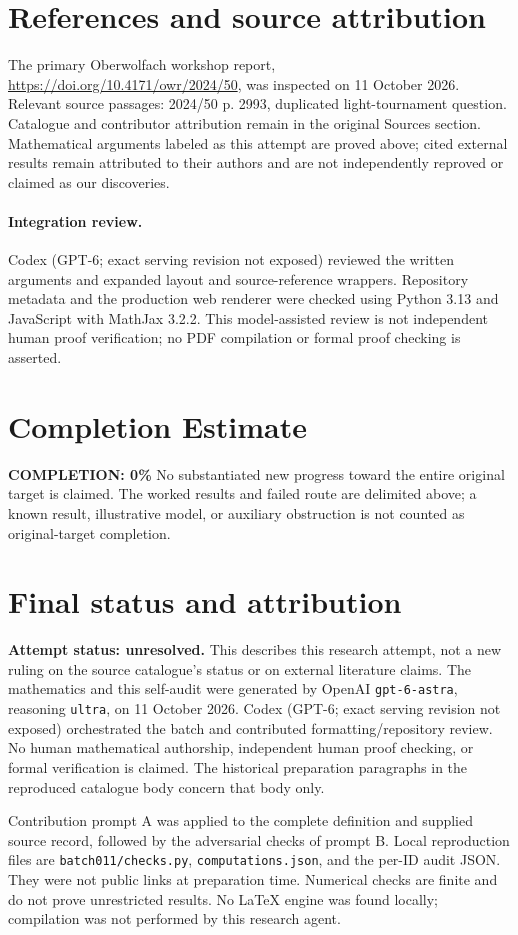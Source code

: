 \documentclass[11pt]{article}
\begin{document}
\section{References and source attribution}
The primary Oberwolfach workshop report, \url{https://doi.org/10.4171/owr/2024/50}, was inspected on 11 October 2026. Relevant source passages: 2024/50 p. 2993, duplicated light-tournament question. Catalogue and contributor attribution remain in the original Sources section. Mathematical arguments labeled as this attempt are proved above; cited external results remain attributed to their authors and are not independently reproved or claimed as our discoveries.


\paragraph{Integration review.} Codex (GPT-6; exact serving revision not exposed) reviewed the written arguments and expanded layout and source-reference wrappers. Repository metadata and the production web renderer were checked using Python 3.13 and JavaScript with MathJax 3.2.2. This model-assisted review is not independent human proof verification; no PDF compilation or formal proof checking is asserted.

\section{Completion Estimate}
\noindent\textbf{COMPLETION: 0\%}
No substantiated new progress toward the entire original target is claimed. The worked results and failed route are delimited above; a known result, illustrative model, or auxiliary obstruction is not counted as original-target completion.

\section{Final status and attribution}
\textbf{Attempt status: unresolved.} This describes this research attempt, not a new ruling on the source catalogue's status or on external literature claims.
The mathematics and this self-audit were generated by OpenAI \texttt{gpt-6-astra}, reasoning \texttt{ultra}, on 11 October 2026. Codex (GPT-6; exact serving revision not exposed) orchestrated the batch and contributed formatting/repository review. No human mathematical authorship, independent human proof checking, or formal verification is claimed. The historical preparation paragraphs in the reproduced catalogue body concern that body only.

Contribution prompt A was applied to the complete definition and supplied source record, followed by the adversarial checks of prompt B. Local reproduction files are \texttt{batch011/checks.py}, \texttt{computations.json}, and the per-ID audit JSON. They were not public links at preparation time. Numerical checks are finite and do not prove unrestricted results. No LaTeX engine was found locally; compilation was not performed by this research agent.
\end{document}
